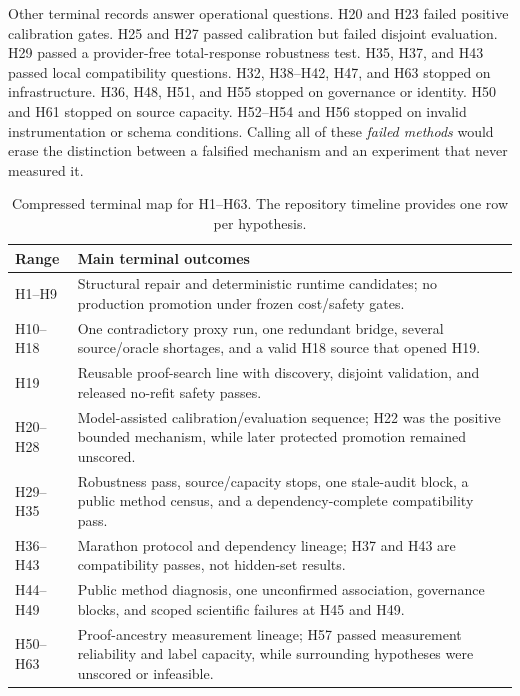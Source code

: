 \documentclass[10pt]{article}
\begin{document}
Other terminal records answer operational questions. H20 and H23 failed positive calibration gates. H25 and H27 passed calibration but failed disjoint evaluation. H29 passed a provider-free total-response robustness test. H35, H37, and H43 passed local compatibility questions. H32, H38--H42, H47, and H63 stopped on infrastructure. H36, H48, H51, and H55 stopped on governance or identity. H50 and H61 stopped on source capacity. H52--H54 and H56 stopped on invalid instrumentation or schema conditions. Calling all of these \emph{failed methods} would erase the distinction between a falsified mechanism and an experiment that never measured it.

\begin{table}[ht]
\centering
\caption{Compressed terminal map for H1--H63. The repository timeline provides one row per hypothesis.}
\label{tab:hmap}
\begin{tabularx}{\textwidth}{l Y}
\toprule
Range & Main terminal outcomes \\
\midrule
H1--H9 & Structural repair and deterministic runtime candidates; no production promotion under frozen cost/safety gates. \\
H10--H18 & One contradictory proxy run, one redundant bridge, several source/oracle shortages, and a valid H18 source that opened H19. \\
H19 & Reusable proof-search line with discovery, disjoint validation, and released no-refit safety passes. \\
H20--H28 & Model-assisted calibration/evaluation sequence; H22 was the positive bounded mechanism, while later protected promotion remained unscored. \\
H29--H35 & Robustness pass, source/capacity stops, one stale-audit block, a public method census, and a dependency-complete compatibility pass. \\
H36--H43 & Marathon protocol and dependency lineage; H37 and H43 are compatibility passes, not hidden-set results. \\
H44--H49 & Public method diagnosis, one unconfirmed association, governance blocks, and scoped scientific failures at H45 and H49. \\
H50--H63 & Proof-ancestry measurement lineage; H57 passed measurement reliability and label capacity, while surrounding hypotheses were unscored or infeasible. \\
\bottomrule
\end{tabularx}
\end{table}
\end{document}
